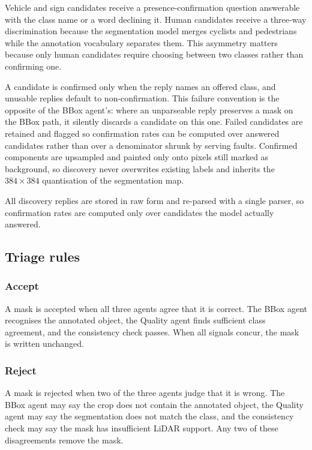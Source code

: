 \documentclass[a4paper,twoside]{article}
\begin{document}
Vehicle and sign candidates receive a presence‑confirmation question answerable with the class name or a word declining it.  
Human candidates receive a three‑way discrimination because the segmentation model merges cyclists and pedestrians while the annotation vocabulary separates them.  
This asymmetry matters because only human candidates require choosing between two classes rather than confirming one.

A candidate is confirmed only when the reply names an offered class, and unusable replies default to non‑confirmation.  
This failure convention is the opposite of the BBox agent’s: where an unparseable reply preserves a mask on the BBox path, it silently discards a candidate on this one.  
Failed candidates are retained and flagged so confirmation rates can be computed over answered candidates rather than over a denominator shrunk by serving faults.  
Confirmed components are upsampled and painted only onto pixels still marked as background, so discovery never overwrites existing labels and inherits the $384 \times 384$ quantisation of the segmentation map.

All discovery replies are stored in raw form and re‑parsed with a single parser, so confirmation rates are computed only over candidates the model actually answered.


\subsection{Triage rules}
\label{sec:triage}

\subsubsection{Accept}
A mask is accepted when all three agents agree that it is correct.  
The BBox agent recognises the annotated object, the Quality agent finds sufficient class agreement, and the consistency check passes.  
When all signals concur, the mask is written unchanged.

\subsubsection{Reject}
A mask is rejected when two of the three agents judge that it is wrong.  
The BBox agent may say the crop does not contain the annotated object, the Quality agent may say the segmentation does not match the class, and the consistency check may say the mask has insufficient LiDAR support.  
Any two of these disagreements remove the mask.
\end{document}
